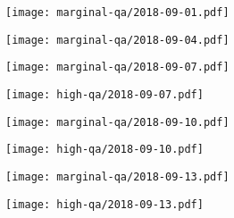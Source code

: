 \documentclass{article}
\begin{document}
\begin{figure}[H]
	\ContinuedFloat
	\centering
	\begin{subfigure}{\linewidth}
		\hspace{0.25cm}
		\texttt{[image: marginal-qa/2018-09-01.pdf]}
	\end{subfigure}
	\begin{subfigure}{\linewidth}
		\hspace{0.25cm}
		\texttt{[image: marginal-qa/2018-09-04.pdf]}
	\end{subfigure}
	\begin{subfigure}{0.48\linewidth}
		\texttt{[image: marginal-qa/2018-09-07.pdf]}
	\end{subfigure}
	\begin{subfigure}{0.48\linewidth}
		\texttt{[image: high-qa/2018-09-07.pdf]}
	\end{subfigure}
	\begin{subfigure}{0.48\linewidth}
		\texttt{[image: marginal-qa/2018-09-10.pdf]}
	\end{subfigure}
	\begin{subfigure}{0.48\linewidth}
		\texttt{[image: high-qa/2018-09-10.pdf]}
	\end{subfigure}
	\begin{subfigure}{0.48\linewidth}
		\texttt{[image: marginal-qa/2018-09-13.pdf]}
	\end{subfigure}
	\begin{subfigure}{0.48\linewidth}
		\texttt{[image: high-qa/2018-09-13.pdf]}
	\end{subfigure}
\end{figure}
\end{document}

